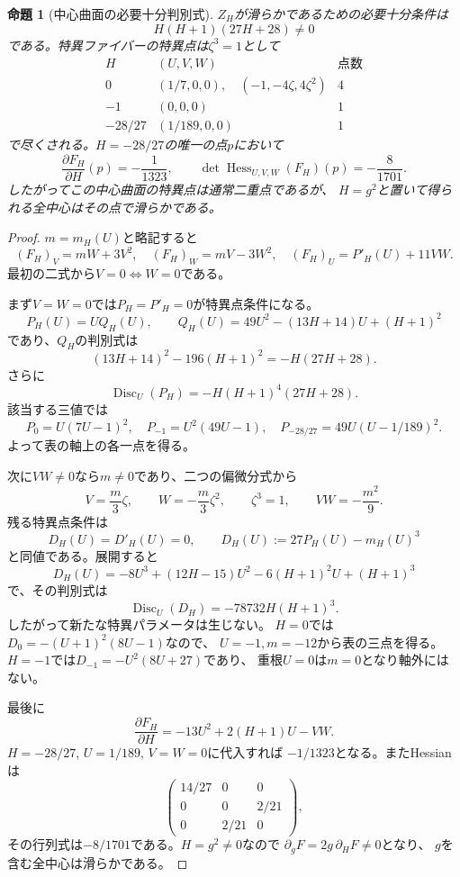 \documentclass[a4paper,11pt]{ltjsarticle}
\newtheorem{proposition}{命題}[section]
\begin{document}
\begin{proposition}[中心曲面の必要十分判別式]\label{prop:disc}
$Z_H$が滑らかであるための必要十分条件は
\[
\boxed{H(H+1)(27H+28)\ne0}
\]
である。特異ファイバーの特異点は$\zeta^3=1$として
\[
\begin{array}{c|l|c}
H &(U,V,W)&\text{点数}\\ \hline
0 & (1/7,0,0),\quad(-1,-4\zeta,4\zeta^2)&4\\
-1 &(0,0,0)&1\\
-28/27 &(1/189,0,0)&1
\end{array}
\]
で尽くされる。$H=-28/27$の唯一の点$p$において
\[
\frac{\partial F_H}{\partial H}(p)=-\frac1{1323},\qquad
\det\operatorname{Hess}_{U,V,W}(F_H)(p)=-\frac8{1701}.
\]
したがってこの中心曲面の特異点は通常二重点であるが、
$H=g^2$と置いて得られる全中心はその点で滑らかである。
\end{proposition}
\begin{proof}
$m=m_H(U)$と略記すると
\[
(F_H)_V=mW+3V^2,\quad
(F_H)_W=mV-3W^2,\quad
(F_H)_U=P'_H(U)+11VW.
\]
最初の二式から$V=0\Longleftrightarrow W=0$である。

まず$V=W=0$では$P_H=P'_H=0$が特異点条件になる。
\[
P_H(U)=UQ_H(U),\qquad
Q_H(U)=49U^2-(13H+14)U+(H+1)^2
\]
であり、$Q_H$の判別式は
\[
(13H+14)^2-196(H+1)^2=-H(27H+28).
\]
さらに
\[
\operatorname{Disc}_U(P_H)
=-H(H+1)^4(27H+28).
\]
該当する三値では
\[
P_0=U(7U-1)^2,\quad
P_{-1}=U^2(49U-1),\quad
P_{-28/27}=49U(U-1/189)^2.
\]
よって表の軸上の各一点を得る。

次に$VW\ne0$なら$m\ne0$であり、二つの偏微分式から
\[
V=\frac m3\zeta,\qquad W=-\frac m3\zeta^2,\qquad
\zeta^3=1,\qquad VW=-\frac{m^2}{9}.
\]
残る特異点条件は
\[
D_H(U)=D'_H(U)=0,\qquad
D_H(U):=27P_H(U)-m_H(U)^3
\]
と同値である。展開すると
\[
D_H(U)=-8U^3+(12H-15)U^2-6(H+1)^2U+(H+1)^3
\]
で、その判別式は
\[
\operatorname{Disc}_U(D_H)
=-78732H(H+1)^3.
\]
したがって新たな特異パラメータは生じない。
$H=0$では$D_0=-(U+1)^2(8U-1)$なので、
$U=-1,m=-12$から表の三点を得る。
$H=-1$では$D_{-1}=-U^2(8U+27)$であり、
重根$U=0$は$m=0$となり軸外にはない。

最後に
\[
\frac{\partial F_H}{\partial H}
=-13U^2+2(H+1)U-VW.
\]
$H=-28/27$, $U=1/189$, $V=W=0$に代入すれば
$-1/1323$となる。またHessianは
\[
\begin{pmatrix}14/27&0&0\\0&0&2/21\\0&2/21&0\end{pmatrix},
\]
その行列式は$-8/1701$である。$H=g^2\ne0$なので
$\partial_gF=2g\,\partial_HF\ne0$となり、
$g$を含む全中心は滑らかである。
\end{proof}
\end{document}
